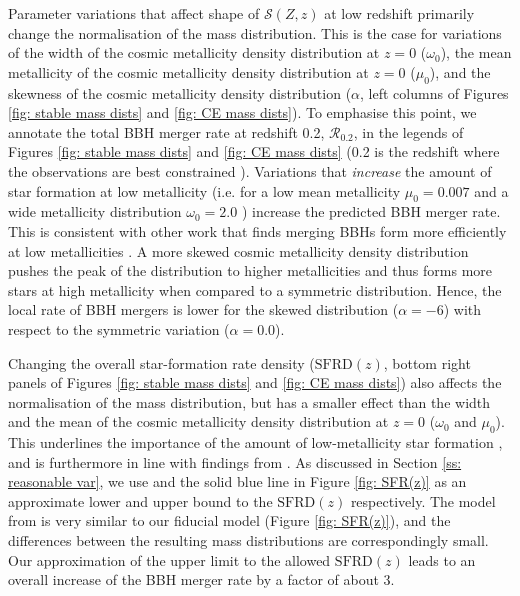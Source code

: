 \documentclass[twocolumn]{aastex631}
\newcommand{\SFRDzZ}{\ensuremath{\mathcal{S}(Z,z)}\xspace}
\newcommand{\SFRDz}{\ensuremath{\mathrm{SFRD}(z)}\xspace}
\begin{document}
Parameter variations that affect shape of \SFRDzZ at low redshift primarily change the normalisation of the mass distribution. This is the case for variations of the width of the cosmic metallicity density distribution at $z=0$ ($\omega_0$), the mean metallicity of the cosmic metallicity density distribution at $z=0$ ($\mu_0$), and the skewness of the cosmic metallicity density distribution ($\alpha$, left columns of Figures \ref{fig: stable mass dists} and \ref{fig: CE mass dists}).
To emphasise this point, we annotate the total BBH merger rate at redshift 0.2, $\mathcal{R}_{0.2}$, in the legends of Figures \ref{fig: stable mass dists} and \ref{fig: CE mass dists} (0.2 is the redshift where the observations are best constrained \citealt{GWTC3_popPaper2021}). 
%
Variations that \textit{increase} the amount of star formation at low metallicity (i.e. for a low mean metallicity $\mu_0=0.007$ and a wide metallicity distribution $\omega_0 = 2.0$ ) increase the predicted BBH merger rate. This is consistent with other work that finds merging BBHs form more efficiently at low metallicities \citep[e.g.][]{BelczynskiVink2010, Stevenson+2017,Mapelli2017,Chruslinska2019_effectCO,Broekgaarden+2021b}.
A more skewed cosmic metallicity density distribution pushes the peak of the distribution to higher metallicities and thus forms more stars at high metallicity when compared to a symmetric distribution. Hence, the local rate of BBH mergers is lower for the skewed distribution ($\alpha = -6$) with respect to the symmetric variation ($\alpha = 0.0$).


Changing the overall star-formation rate density (\SFRDz, bottom right panels of Figures \ref{fig: stable mass dists} and \ref{fig: CE mass dists}) also affects the normalisation of the mass distribution, but has a smaller effect than the width and the mean of the cosmic metallicity density distribution at $z=0$ ($\omega_0$ and $\mu_0$). This underlines the importance of the amount of low-metallicity star formation \citep[e.g.,][]{chruslinska2022_review}, and is furthermore in line with findings from \cite{Tang+2020}.
As discussed in Section \ref{ss: reasonable var}, we use \cite{Madau+2017} and the solid blue line in Figure \ref{fig: SFR(z)} as an approximate lower and upper bound to the \SFRDz respectively. 
The model from \cite{Madau+2017} is very similar to our fiducial model (Figure \ref{fig: SFR(z)}), and the differences between the resulting mass distributions are correspondingly small. Our approximation of the upper limit to the allowed \SFRDz leads to an overall increase of the BBH merger rate by a factor of about 3. 
\end{document}
